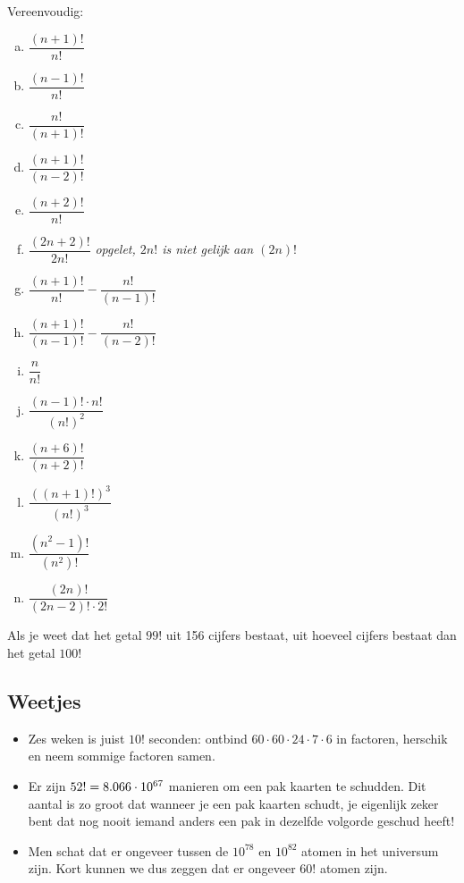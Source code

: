 \documentclass[12pt,a4paper,twoside]{article}
\begin{document}
\begin{oefening}
Vereenvoudig:
\begin{multicols}{2}
\begin{enumerate}[(a)]
  \itemsep.7em
  \item $\dfrac{(n+1)!}{n!}$
  \item $\dfrac{(n-1)!}{n!}$
  \item $\dfrac{n!}{(n+1)!}$
  \item $\dfrac{(n+1)!}{(n-2)!}$
  \item $\dfrac{(n+2)!}{n!}$
  \item $\dfrac{(2n+2)!}{2n!}$ \hfill {\em\scriptsize opgelet, $2n!$ is niet gelijk aan $(2n)!$}
  \item $\dfrac{(n+1)!}{n!}-\dfrac{n!}{(n-1)!}$
  \item $\dfrac{(n+1)!}{(n-1)!}-\dfrac{n!}{(n-2)!}$
  \item $\dfrac{n}{n!}$
  \item $\dfrac{(n-1)!\cdot n!}{(n!)^2}$
  \item $\dfrac{(n+6)!}{(n+2)!}$
  \item $\dfrac{\left(\left(n+1\right)!\right)^3}{(n!)^3}$
  \item $\dfrac{(n^2-1)!}{(n^2)!}$
  \item $\dfrac{(2n)!}{(2n-2)!\cdot 2!}$
\end{enumerate}
\end{multicols}
\end{oefening}

\begin{oefening}
Als je weet dat het getal $99!$ uit 156 cijfers bestaat, uit hoeveel cijfers bestaat dan het getal $100!$
\end{oefening}

\subsection*{Weetjes}
\begin{itemize}
  \item Zes weken is juist $10!$ seconden: ontbind $60\cdot 60\cdot 24\cdot 7\cdot 6$ in factoren, herschik en neem sommige factoren samen.
  \item Er zijn $52!=8.066\cdot 10^{67}$ manieren om een pak kaarten te schudden. Dit aantal is zo groot dat wanneer je een pak kaarten schudt, je eigenlijk zeker bent dat nog nooit iemand anders een pak in dezelfde volgorde geschud heeft!
  \item Men schat dat er ongeveer tussen de $10^{78}$ en $10^{82}$ atomen in het universum zijn. Kort kunnen we dus zeggen dat er ongeveer $60!$ atomen zijn.
\end{itemize}
\end{document}
